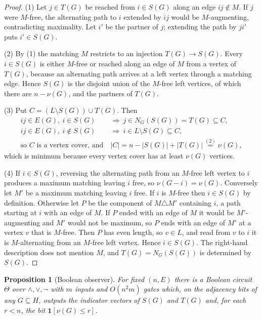 \documentclass[11pt]{article}
\newtheorem{proposition}[theorem]{Proposition}
\begin{document}
\begin{proof}
(1)  Let $j\in T(G)$ be reached from $i\in S(G)$ along an edge $ij\notin M$.  If
$j$ were $M$-free, the alternating path to $i$ extended by $ij$ would be
$M$-augmenting, contradicting maximality.  Let $i'$ be the partner of $j$;
extending the path by $ji'$ puts $i'\in S(G)$.

(2)  By (1) the matching $M$ restricts to an injection $T(G)\to S(G)$.  Every
$i\in S(G)$ is either $M$-free or reached along an edge of $M$ from a vertex of
$T(G)$, because an alternating path arrives at a left vertex through a matching
edge.  Hence $S(G)$ is the disjoint union of the $M$-free left vertices, of
which there are $n-\nu(G)$, and the partners of $T(G)$.

(3)  Put $C=(L\setminus S(G))\cup T(G)$.  Then
\begin{align*}
  ij\in E(G),\ i\in S(G)
    &\ \Longrightarrow\ j\in N_G(S(G))=T(G)\subseteq C,\\
  ij\in E(G),\ i\notin S(G)
    &\ \Longrightarrow\ i\in L\setminus S(G)\subseteq C,\\
  \text{so $C$ is a vertex cover, and}
    &\ |C|=n-|S(G)|+|T(G)|\overset{(2)}{=}\nu(G),
\end{align*}
which is minimum because every vertex cover has at least $\nu(G)$ vertices.

(4)  If $i\in S(G)$, reversing the alternating path from an $M$-free left vertex
to $i$ produces a maximum matching leaving $i$ free, so $\nu(G-i)=\nu(G)$.
Conversely let $M'$ be a maximum matching leaving $i$ free.  If $i$ is $M$-free
then $i\in S(G)$ by definition.  Otherwise let $P$ be the component of
$M\triangle M'$ containing $i$, a path starting at $i$ with an edge of $M$.  If
$P$ ended with an edge of $M$ it would be $M'$-augmenting and $M'$ would not be
maximum, so $P$ ends with an edge of $M'$ at a vertex $v$ that is $M$-free.
Then $P$ has even length, so $v\in L$, and read from $v$ to $i$ it is
$M$-alternating from an $M$-free left vertex.  Hence $i\in S(G)$.  The
right-hand description does not mention $M$, and $T(G)=N_G(S(G))$ is determined
by $S(G)$.
\end{proof}

\begin{proposition}[Boolean observer]
\label{prop:observer}
For fixed $(n,E)$ there is a Boolean circuit $\Theta$ over $\wedge,\vee,\neg$
with $m$ inputs and $O(n^{2}m)$ gates which, on the adjacency bits of any
$G\subseteq H$, outputs the indicator vectors of $S(G)$ and $T(G)$ and, for each
$r<n$, the bit $\mathbf1[\nu(G)\le r]$.
\end{proposition}
\end{document}
